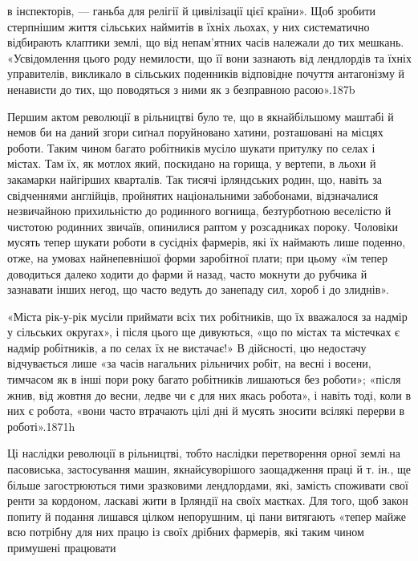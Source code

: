 в інспекторів, — ганьба для релігії й цивілізації цієї країни».
Щоб зробити стерпнішим життя сільських наймитів в їхніх льохах,
у них систематично відбирають клаптики землі, що від непам’ятних
часів належали до тих мешкань. «Усвідомлення цього
роду немилости, що її вони зазнають від лендлордів та їхніх управителів,
викликало в сільських поденників відповідне почуття
антагонізму й ненависти до тих, що поводяться з ними як з безправною
расою».187b

Першим актом революції в рільництві було те, що в якнайбільшому
маштабі й немов би на даний згори сиґнал поруйновано
хатини, розташовані на місцях роботи. Таким чином багато робітників
мусіло шукати притулку по селах і містах. Там їх, як
мотлох який, поскидано на горища, у вертепи, в льохи й закамарки
найгірших кварталів. Так тисячі ірляндських родин, що,
навіть за свідченнями англійців, пройнятих національними забобонами,
відзначалися незвичайною прихильністю до родинного
вогнища, безтурботною веселістю й чистотою родинних звичаїв,
опинилися раптом у розсадниках пороку. Чоловіки мусять тепер
шукати роботи в сусідніх фармерів, які їх наймають лише поденно,
отже, на умовах найнепевнішої форми заробітної плати;
при цьому «їм тепер доводиться далеко ходити до фарми й назад,
часто мокнути до рубчика й зазнавати інших негод, що часто
ведуть до занепаду сил, хороб і до злиднів».

«Міста рік-у-рік мусіли приймати всіх тих робітників, що
їх вважалося за надмір у сільських округах», і після цього
ще дивуються, «що по містах та містечках є надмір робітників,
а по селах їх не вистачає!» В дійсності, цю недостачу відчувається
лише «за часів нагальних рільничих робіт, на весні
і восени, тимчасом як в інші пори року багато робітників лишаються
без роботи»; «після жнив, від жовтня до весни, ледве
чи є для них якась робота», і навіть тоді, коли в них є робота,
«вони часто втрачають цілі дні й мусять зносити всілякі
перерви в роботі».1871h

Ці наслідки революції в рільництві, тобто наслідки перетворення
орної землі на пасовиська, застосування машин, якнайсуворішого
заощадження праці й т. ін., ще більше загострюються
тими зразковими лендлордами, які, замість споживати свої ренти
за кордоном, ласкаві жити в Ірляндії на своїх маєтках. Для того,
щоб закон попиту й подання лишався цілком непорушним, ці
пани витягають «тепер майже всю потрібну для них працю із
своїх дрібних фармерів, які таким чином примушені працювати